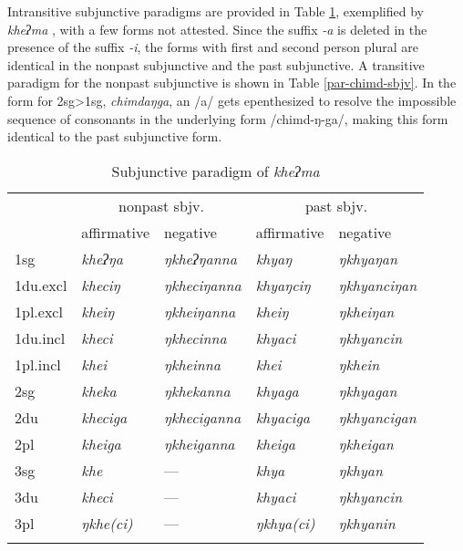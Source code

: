 Intransitive  subjunctive paradigms are provided in Table \ref{par-sbjv-intr}, exemplified by \emph{kheʔma} ,  with a few forms not attested. Since the suffix \emph{-a} is deleted in the presence of the suffix \emph{-i}, the forms with first and second person plural are identical in the nonpast subjunctive and the past subjunctive. A transitive paradigm for the nonpast subjunctive is shown in Table \ref{par-chimd-sbjv}.  In the  form for {\sc 2sg>1sg}, \emph{chimdaŋga}, an /a/ gets epenthesized to resolve the impossible sequence of consonants in the underlying form /chimd-ŋ-ga/, making this form  identical to  the past subjunctive form.

\begin{table}[htp]
\begin{centering}
\begin{tabular}{lllll}
\lsptoprule
&\multicolumn{2}{c}{{\sc nonpast sbjv.}}&\multicolumn{2}{c}{{\sc past sbjv.}}\\
		&{\sc affirmative} & {\sc negative} & {\sc affirmative} & {\sc negative}  \\
\midrule
		{\sc 1sg}& \it kheʔŋa& \it ŋkheʔŋanna& \it khyaŋ& \it ŋkhyaŋan \\
		{\sc 1du.excl}& \it kheciŋ& \it ŋkheciŋanna& \it khyaŋciŋ& \it ŋkhyanciŋan \\
		{\sc 1pl.excl}& \it kheiŋ& \it ŋkheiŋanna& \it kheiŋ& \it ŋkheiŋan \\
		{\sc 1du.incl}& \it kheci& \it ŋkhecinna& \it khyaci& \it ŋkhyancin \\
		{\sc1pl.incl}& \it khei& \it ŋkheinna& \it khei& \it ŋkhein \\
\midrule
		{\sc 2sg}& \it kheka& \it ŋkhekanna& \it khyaga& \it ŋkhyagan \\
		{\sc 2du}& \it kheciga& \it ŋkheciganna& \it khyaciga& \it ŋkhyancigan \\
		{\sc2pl}& \it kheiga& \it ŋkheiganna& \it kheiga& \it ŋkheigan \\
\midrule
		{\sc 3sg}& \it khe& — & \it khya& \it ŋkhyan \\
		{\sc 3du}& \it kheci&   — & \it khyaci& \it ŋkhyancin \\
		{\sc 3pl}& \it ŋkhe(ci)&   — & \it ŋkhya(ci)& \it ŋkhyanin \\
\lspbottomrule	
\end{tabular}
\end{centering}
\caption{Subjunctive paradigm of \emph{kheʔma} }\label{par-sbjv-intr}
\end{table}


